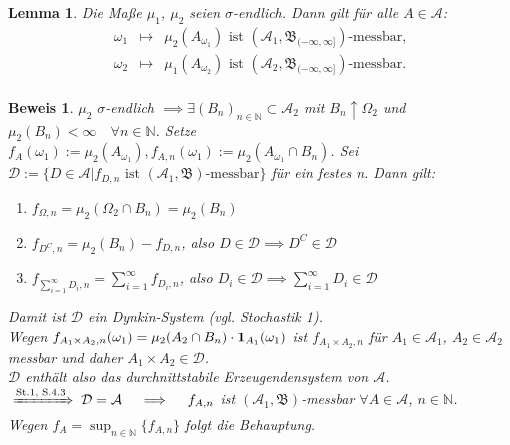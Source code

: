 \documentclass[a4paper,11pt]{scrbook}
\newcommand{\N}{{\mathbb N}}
\newcommand{\ind}{\text{\bf{1}}}
\def\AA{ \mathcal{A} }
\def\BB{ \mathfrak{B} }
\def\folgt{\ensuremath{\implies}}
\newcommand{\folgtnach}[1]{\ensuremath{\DOTSB\;\xRightarrow{\text{#1}}\;}}
\newtheorem{Lem}{Lemma}[chapter]
\theoremstyle{nonumberplain}
\newtheorem{Bew}{Beweis}
\begin{document}
\begin{Lem} \label{Lem3.2}Die Maße $\mu_1$, $\mu_2$ seien $\sigma$-endlich. Dann gilt für alle $A\in\AA$: \\
\begin{eqnarray*}
\omega_1 & \mapsto & \mu_2(A_{\omega_1}) \text{ ist } (\AA_1,\BB_{(-\infty,\infty]})\text{-messbar,} \\
\omega_2 & \mapsto & \mu_1(A_{\omega_2}) \text{ ist } (\AA_2,\BB_{(-\infty,\infty]})\text{-messbar.} \\
\end{eqnarray*}
\end{Lem}
\begin{Bew} $\mu_2$ $\sigma$-endlich $\folgt \exists (B_n)_{n\in\N}\subset\AA_2$ mit $B_n\uparrow\Omega_2$ und $\mu_2(B_n)<\infty\quad\forall n\in\N$. Setze $f_A(\omega_1):=\mu_2(A_{\omega_1}), f_{A,n}(\omega_1):=\mu_2(A_{\omega_1}\cap B_n)$. Sei $\mathcal{D}:=\{D\in\AA|f_{D,n}\text{ ist }(\AA_1,\BB)\text{-messbar}\}$ für ein festes n. Dann gilt: \\
\begin{enumerate}
\item[(i)] $f_{\Omega,n}=\mu_2(\Omega_2\cap B_n)=\mu_2(B_n)$
\item[(ii)] $f_{D^C,n}=\mu_2(B_n) - f_{D,n}$, also $D\in\mathcal{D}\folgt D^C\in\mathcal{D}$
\item[(iii)] $f_{\sum_{i=1}^{\infty}D_i,n} = \sum_{i=1}^{\infty}f_{D_i,n}$, also $D_i\in\mathcal{D}\folgt\sum_{i=1}^{\infty}D_i\in\mathcal{D}$
\end{enumerate}
Damit ist $\mathcal{D}$ ein Dynkin-System (vgl. Stochastik 1). \\
Wegen $f_{A_1\times A_2,n}(\omega_1) = \mu_2(A_2\cap B_n)\cdot \ind_{A_1}(\omega_1)$ ist $f_{A_1\times A_2,n}$ für $A_1\in\AA_1$, $A_2\in\AA_2$ messbar und daher $A_1\times A_2\in\mathcal{D}$. \\
$\mathcal{D}$ enthält also das durchnittstabile Erzeugendensystem von $\AA$. \\
$\folgtnach{St.1, S.4.3}\mathcal{D}=\AA \quad\folgt\quad f_{A,n}$ ist $(\AA_1,\BB)$-messbar $\forall A\in\AA$, $n\in\N$. \\
Wegen $f_A=\sup_{n\in\N}\{f_{A,n}\}$ folgt die Behauptung.
\end{Bew}
\end{document}
